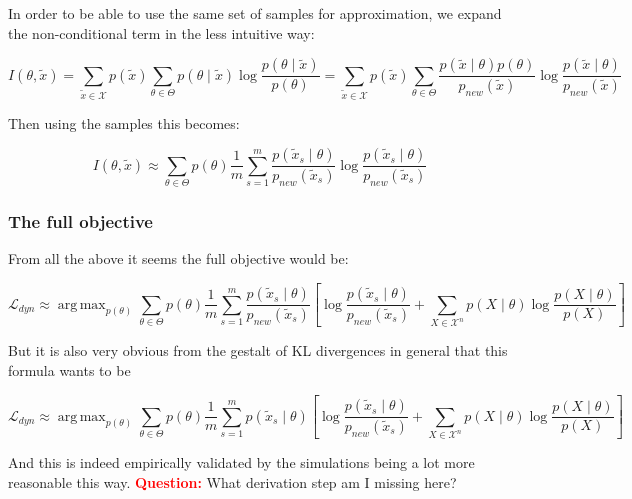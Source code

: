 \documentclass{article}
\DeclareMathOperator*{\argmax}{arg\,max}
\newcommand{\Q}{\textcolor{red}{\textbf{Question: }}}
\begin{document}
In order to be able to use the same set of samples for approximation, we expand the non-conditional term in the less intuitive way:

\begin{equation}
    I(\theta, \tilde{x}) =  \sum_{\tilde{x} \in \mathcal{X}} p(\tilde{x}) \sum_{\theta \in \Theta} p(\theta \mid \tilde{x}) \log \frac{p(\theta \mid \tilde{x})}{p(\theta)} = 
    \sum_{\tilde{x} \in \mathcal{X}} p(\tilde{x}) \sum_{\theta \in \Theta} \frac{p(\tilde{x} \mid \theta) p(\theta)}{p_{new}(\tilde{x})} \log \frac{p(\tilde{x} \mid \theta)}{p_{new}(\tilde{x})}
\end{equation}


Then using the samples this becomes:

\begin{equation}
    I(\theta, \tilde{x}) \approx  \sum_{\theta \in \Theta} p(\theta) \frac{1}{m}\sum_{s=1}^m \frac{p(\tilde{x}_s \mid \theta)}{p_{new}(\tilde{x}_s)}  \log \frac{p(\tilde{x}_s \mid \theta)}{p_{new}(\tilde{x}_s)}
\end{equation}

\subsubsection{The full objective}

From all the above it seems the full objective would be:

\begin{equation}
    \mathcal{L}_{dyn} \approx \argmax_{p(\theta)} \sum_{\theta \in \Theta} p(\theta) \frac{1}{m}\sum_{s=1}^m  \frac{p(\tilde{x}_s \mid \theta)}{p_{new}(\tilde{x}_s)}  \left[ \log \frac{p(\tilde{x}_s \mid \theta)}{p_{new}(\tilde{x}_s)} + \sum_{X \in \mathcal{X}^n} p(X \mid \theta) \log \frac{p(X \mid \theta)}{p(X)} \right]
\end{equation}

But it is also very obvious from the gestalt of KL divergences in general that this formula wants to be 

\begin{equation}
    \mathcal{L}_{dyn} \approx \argmax_{p(\theta)} \sum_{\theta \in \Theta} p(\theta) \frac{1}{m}\sum_{s=1}^m  p(\tilde{x}_s \mid \theta)  \left[ \log \frac{p(\tilde{x}_s \mid \theta)}{p_{new}(\tilde{x}_s)} + \sum_{X \in \mathcal{X}^n} p(X \mid \theta) \log \frac{p(X \mid \theta)}{p(X)} \right]
\end{equation}

And this is indeed empirically validated by the simulations being a lot more reasonable this way. 
\Q What derivation step am I missing here?
\end{document}
